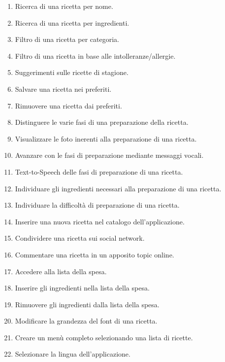 \begin{enumerate}
\label{newtasks}
\item Ricerca di una ricetta per nome.
\item Ricerca di una ricetta per ingredienti.
\item Filtro di una ricetta per categoria.
\item Filtro di una ricetta in base alle intolleranze/allergie.
\item Suggerimenti sulle ricette di stagione.
\item Salvare una ricetta nei preferiti.
\item Rimuovere una ricetta dai preferiti.
\item Distinguere le varie fasi di una preparazione della ricetta.
\item Visualizzare le foto inerenti alla preparazione di
una ricetta.
\item Avanzare con le fasi di preparazione mediante messaggi vocali.
\item Text-to-Speech delle fasi di preparazione di una ricetta.
\item Individuare gli ingredienti necessari alla preparazione di una
ricetta.
\item Individuare la difficoltà di preparazione di una ricetta.
\item Inserire una nuova ricetta nel catalogo dell'applicazione.
\item Condividere una ricetta sui social network.
\item Commentare una ricetta in un apposito topic online.
\item Accedere alla lista della spesa.
\item Inserire gli ingredienti nella lista della spesa.
\item Rimuovere gli ingredienti dalla lista della spesa.
\item Modificare la grandezza del font di una ricetta.
\item Creare un menù completo selezionando una lista di ricette.
\item Selezionare la lingua dell'applicazione.
\end{enumerate}

